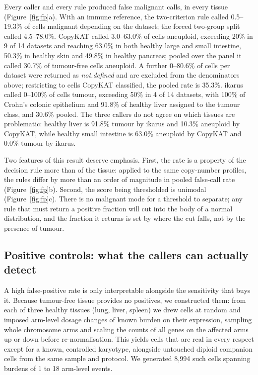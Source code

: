 \documentclass[11pt]{article}
\begin{document}
Every caller and every rule produced false malignant calls, in every tissue
(Figure~\ref{fig:fp}a). With an immune reference, the two-criterion rule
called 0.5--19.3\% of cells malignant depending on the dataset; the forced
two-group split called 4.5--78.0\%. CopyKAT called 3.0--63.0\% of cells
aneuploid, exceeding 20\% in 9 of 14 datasets and reaching 63.0\% in both
healthy large and small intestine, 50.3\% in healthy skin and 49.8\% in
healthy pancreas; pooled over the panel it called 30.7\% of tumour-free cells
aneuploid. A further 0--80.6\% of cells per dataset were returned as
\emph{not.defined} and are excluded from the denominators above; restricting
to cells CopyKAT classified, the pooled rate is 35.3\%. ikarus called
0--100\% of cells tumour, exceeding 50\% in 4 of 14 datasets, with 100\% of
Crohn's colonic epithelium and 91.8\% of healthy liver assigned to the tumour
class, and 30.6\% pooled. The three callers do not agree on which tissues are
problematic: healthy liver is 91.8\% tumour by ikarus and 10.3\% aneuploid by
CopyKAT, while healthy small intestine is 63.0\% aneuploid by CopyKAT and
0.0\% tumour by ikarus.

Two features of this result deserve emphasis. First, the rate is a property
of the decision rule more than of the tissue: applied to the same copy-number
profiles, the rules differ by more than an order of magnitude in pooled
false-call rate (Figure~\ref{fig:fp}b). Second, the score being thresholded
is unimodal (Figure~\ref{fig:fp}c). There is no malignant mode for a
threshold to separate; any rule that must return a positive fraction will cut
into the body of a normal distribution, and the fraction it returns is set by
where the cut falls, not by the presence of tumour.

\subsection{Positive controls: what the callers can actually detect}

A high false-positive rate is only interpretable alongside the sensitivity
that buys it. Because tumour-free tissue provides no positives, we
constructed them: from each of three healthy tissues (lung, liver, spleen) we
drew cells at random and imposed arm-level dosage changes of known burden on
their expression, sampling whole chromosome arms and scaling the counts of
all genes on the affected arms up or down before re-normalisation. This
yields cells that are real in every respect except for a known, controlled
karyotype, alongside untouched diploid companion cells from the same sample
and protocol. We generated 8{,}994 such cells spanning burdens of 1 to 18
arm-level events.
\end{document}
